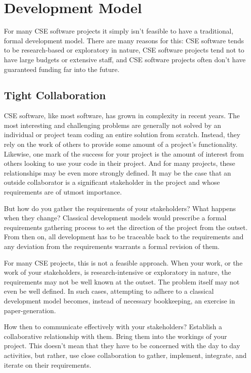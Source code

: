 \documentclass[12pt,relax]{article}
\begin{document}
\section{Development Model}
\label{Section:Development Model}

For many CSE software projects it simply isn't feasible to have a traditional, 
formal development model.  There are many reasons for this:  CSE software tends
to be research-based or exploratory in nature, CSE software projects tend not
to have large budgets or extensive staff, and CSE software projects often don't
have guaranteed funding far into the future.

\subsection{Tight Collaboration}

CSE software, like most software, has grown in complexity in recent years.  The
most interesting and challenging problems are generally not solved by an
individual or project team coding an entire solution from scratch.  Instead,
they rely on the work of others to provide some amount of a project's
functionality.  Likewise, one mark of the success for your project is the
amount of interest from others looking to use your code in their project.
And for many projects, these relationships may be even more strongly defined.
It may be the case that an outside collaborator is a significant stakeholder in
the project and whose requirements are of utmost importance.

But how do you gather the requirements of your stakeholders?  What happens
when they change?  Classical development models would prescribe a formal
requirements gathering process to set the direction of the project from the
outset.  From then on, all development has to be traceable back to the
requirements and any deviation from the requirements warrants a formal revision
of them.  

For many CSE projects, this is not a feasible approach.  When your work, or the
work of your stakeholders, is research-intensive or exploratory in nature, the
requirements may not be well known at the outset.  The problem itself may not
even be well defined.  In such cases, attempting to adhere to a classical
development model becomes, instead of necessary bookkeeping, an exercise in 
paper-generation.

How then to communicate effectively with your stakeholders?  Establish a
collaborative relationship with them.  Bring them into the workings of your
project.  This doesn't mean that they have to be concerned with the day to day
activities, but rather, use close collaboration to gather, implement,
integrate, and iterate on their requirements.
\end{document}

